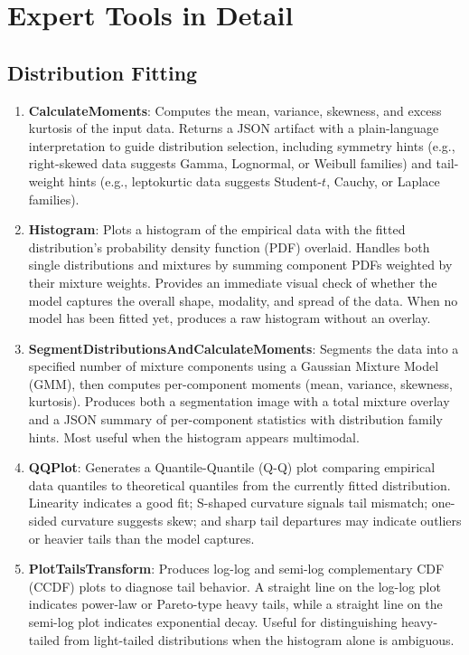 \documentclass{article}
\begin{document}
\section{Expert Tools in Detail}
\label{app:tools}
\subsection{Distribution Fitting}
\begin{enumerate}
    \item \textbf{CalculateMoments}: Computes the mean, variance, skewness, and excess 
    kurtosis of the input data. Returns a JSON artifact with a plain-language interpretation 
    to guide distribution selection, including symmetry hints (e.g., right-skewed data 
    suggests Gamma, Lognormal, or Weibull families) and tail-weight hints (e.g., leptokurtic 
    data suggests Student-$t$, Cauchy, or Laplace families).

    \item \textbf{Histogram}: Plots a histogram of the empirical data with the fitted 
    distribution's probability density function (PDF) overlaid. Handles both single 
    distributions and mixtures by summing component PDFs weighted by their mixture weights. 
    Provides an immediate visual check of whether the model captures the overall shape, 
    modality, and spread of the data. When no model has been fitted yet, produces a raw 
    histogram without an overlay.

    \item \textbf{SegmentDistributionsAndCalculateMoments}: Segments the data into a 
    specified number of mixture components using a Gaussian Mixture Model (GMM), then computes 
    per-component moments (mean, variance, skewness, kurtosis). Produces both a segmentation 
    image with a total mixture overlay and a JSON summary of per-component statistics with 
    distribution family hints. Most useful when the histogram appears multimodal.

    \item \textbf{QQPlot}: Generates a Quantile-Quantile (Q-Q) plot comparing empirical 
    data quantiles to theoretical quantiles from the currently fitted distribution. Linearity 
    indicates a good fit; S-shaped curvature signals tail mismatch; one-sided curvature 
    suggests skew; and sharp tail departures may indicate outliers or heavier tails than 
    the model captures.

    \item \textbf{PlotTailsTransform}: Produces log-log and semi-log complementary CDF 
    (CCDF) plots to diagnose tail behavior. A straight line on the log-log plot indicates 
    power-law or Pareto-type heavy tails, while a straight line on the semi-log plot indicates 
    exponential decay. Useful for distinguishing heavy-tailed from light-tailed distributions 
    when the histogram alone is ambiguous.


\end{enumerate}
\end{document}
